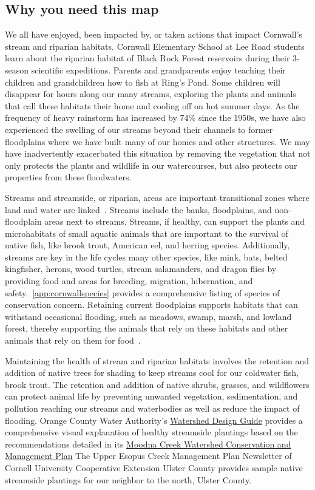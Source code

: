 \subsection*{Why you need this map}
We all have enjoyed, been impacted by, or taken actions that impact Cornwall's
stream and riparian habitats. Cornwall Elementary School at Lee Road students
learn about the riparian habitat of Black Rock Forest reservoirs during their
3-season scientific expeditions. Parents and grandparents enjoy teaching their
children and grandchildren how to fish at Ring’s Pond. Some children will
disappear for hours along our many streams, exploring the plants and animals
that call these habitats their home and cooling off on hot summer days. As the
frequency of heavy rainstorm has increased by 74\% since the 1950s, we have
also experienced the swelling of our streams beyond their channels to former
floodplains where we have built many of our homes and other structures. We may
have inadvertently exacerbated this situation by removing the vegetation that
not only protects the plants and wildlife in our watercourses, but also
protects our properties from these floodwaters.
\par
Streams and streamside, or riparian, areas are important transitional zones
where land and water are linked~\citep{haeckel2014}. Streams include the banks,
floodplains, and non-floodplain areas next to streams. Streams, if healthy, can
support the plants and microhabitats of small aquatic animals that are
important to the survival of native fish, like brook trout, American eel, and
herring species. Additionally, streams are key in the life cycles many other
species, like mink, bats, belted kingfisher, herons, wood turtles, stream
salamanders, and dragon flies by providing food and areas for breeding,
migration, hibernation, and safety.~\ref{app:cornwallspecies}
provides a comprehensive listing of species of conservation concern. Retaining
current floodplains supports habitats that can withstand occasional flooding,
such as meadows, swamp, marsh, and lowland forest, thereby supporting the
animals that rely on these habitats and other animals that rely on them for
food~\citep{haeckel2014}.
\par
Maintaining the health of stream and riparian habitats involves the retention
and addition of native trees for shading to keep streams cool for our coldwater
fish, brook trout. The retention and addition of native shrubs, grasses, and
wildflowers can protect animal life by preventing unwanted vegetation,
sedimentation, and pollution reaching our streams and waterbodies as well as
reduce the impact of flooding. Orange County Water Authority's
\href{https://www.orangecountygov.com/DocumentCenter/View/4135/Watershed-Design-Guide-2014-PDF}
{Watershed Design Guide} provides a comprehensive visual explanation of healthy
streamside plantings based on the recommendations detailed in its
\href{https://www.orangecountygov.com/DocumentCenter/View/4133/Moodna-Creek-Watershed-Conservation-and-Management-Plan-2010-PDF}{Moodna
Creek Watershed Conservation and Management Plan} The Upper Esopus Creek
Management Plan Newsletter of Cornell University Cooperative Extension Ulster
County provides sample native streamside plantings for our neighbor to the
north, Ulster County.

